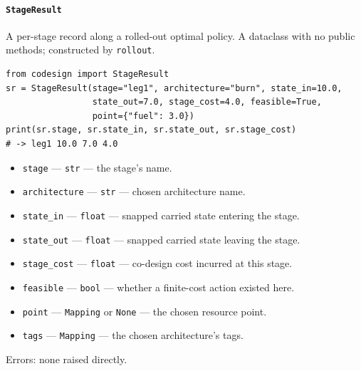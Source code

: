 \documentclass[11pt,a4paper]{article}
\begin{document}
\paragraph{\texttt{StageResult}}\label{ref:dynamic:stageresult}
A per-stage record along a rolled-out optimal policy. A dataclass with no
public methods; constructed by \texttt{rollout}.
\begin{lstlisting}
from codesign import StageResult
sr = StageResult(stage="leg1", architecture="burn", state_in=10.0,
                 state_out=7.0, stage_cost=4.0, feasible=True,
                 point={"fuel": 3.0})
print(sr.stage, sr.state_in, sr.state_out, sr.stage_cost)
# -> leg1 10.0 7.0 4.0
\end{lstlisting}
\begin{itemize}[nosep]
  \item \texttt{stage} --- \texttt{str} --- the stage's name.
  \item \texttt{architecture} --- \texttt{str} --- chosen architecture name.
  \item \texttt{state\_in} --- \texttt{float} --- snapped carried state
    entering the stage.
  \item \texttt{state\_out} --- \texttt{float} --- snapped carried state
    leaving the stage.
  \item \texttt{stage\_cost} --- \texttt{float} --- co-design cost incurred
    at this stage.
  \item \texttt{feasible} --- \texttt{bool} --- whether a finite-cost action
    existed here.
  \item \texttt{point} --- \texttt{Mapping} or \texttt{None} --- the chosen
    resource point.
  \item \texttt{tags} --- \texttt{Mapping} --- the chosen architecture's
    tags.
\end{itemize}
Errors: none raised directly.
\end{document}
